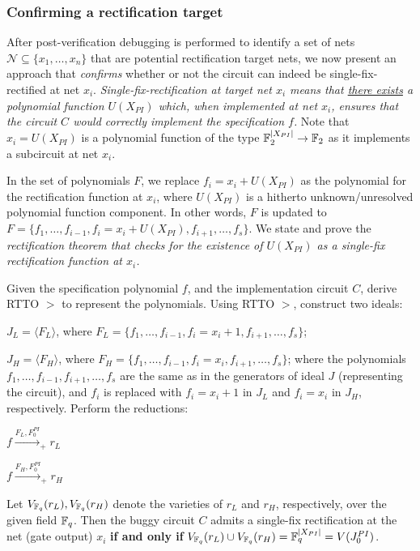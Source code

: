 \subsubsection{Confirming a rectification target} 
After post-verification debugging is performed to identify a set of
nets $\mathcal{N}\subseteq \{x_1,\dots,x_n\}$ that are potential
rectification target nets, we now present an approach that {\it confirms}
whether or not the circuit can indeed be single-fix-rectified at net
$x_i$. {\it Single-fix-rectification at target net $x_i$ means that
  \underline{there exists} a polynomial function $U(X_{PI})$ which,
  when implemented at net $x_i$, ensures that the circuit $C$ would
  correctly implement the specification $f$.} Note that
$x_i=U(X_{PI})$ is a polynomial function of the type
${\mathbb{F}}_2^{|X_{PI}|}\rightarrow{\mathbb{F}}_2$ as it implements a subcircuit at net $x_i$.

In the set of polynomials $F$, we replace $f_i = x_i+U(X_{PI})$ as the
polynomial for the rectification function at $x_i$, where $U(X_{PI})$
is a hitherto unknown/unresolved polynomial function component. In
other words, $F$ is updated to $F = \{f_1,\dots, f_{i-1}, f_i=
x_i+U(X_{PI}),f_{i+1},\dots,f_s\}$.  We state and prove the 
{\it rectification theorem that checks for the existence of
  $U(X_{PI})$ as a single-fix rectification function at $x_i$.}

\begin{Theorem}
Given the specification polynomial $f$, and the implementation circuit
$C$, derive RTTO $>$ to represent the polynomials. Using RTTO $>$,
construct two ideals:  
\bi
\item $J_L = \langle F_L\rangle$, where
  $F_L=\{f_1,\dots,f_{i-1},f_i=x_i+1$$,f_{i+1},\dots,f_s\}$;
\item $J_H = \langle F_H\rangle$, where
  $F_H=\{f_1,\dots,f_{i-1},f_i=x_i$$,f_{i+1},\dots,f_s\}$;
\ei
where the polynomials $f_1,\dots,f_{i-1},f_{i+1},\dots,f_s$ are the
same as in the generators of ideal $J$ (representing the circuit), and
$f_i$ is replaced with $f_i = x_i+1$ in $J_L$ and $f_i = x_i$ in $J_H$,
respectively. Perform the reductions: 
\bi
\item $f\xrightarrow{F_L, F_{0}^{PI}}_+r_L $
\item $f\xrightarrow{F_H,F_{0}^{PI}}_+r_H $
\ei

Let $V_{{\mathbb{F}}_{q}}(r_L), V_{{\mathbb{F}}_{q}}(r_H)$ denote the varieties of $r_L$ and
$r_H$, respectively, over the given field ${\mathbb{F}}_{q}$. Then the buggy
circuit $C$ admits a single-fix rectification at the net (gate 
output) $x_i$ \textbf{if and only if} $V_{{\mathbb{F}}_{q}}(r_L) \cup V_{{\mathbb{F}}_{q}}(r_H) =
{\mathbb{F}}_{q}^{|X_{PI}|} = V(J_0^{PI})$.
\end{Theorem}

